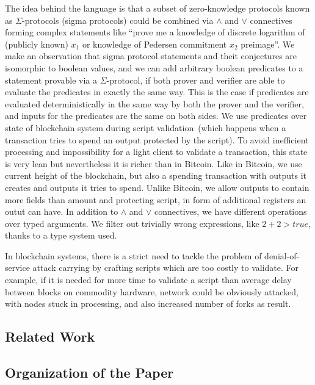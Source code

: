 \documentclass[11pt]{article}
\newcommand{\authnote}[2]{\marginpar{\parbox{\marginparwidth}{\tiny %
  \textsf{#1 {\textcolor{blue}{notes: #2}}}}}%
  \textcolor{blue}{\textbf{\dag}}}
\newcommand{\authnote}[2]{
  \textsf{#1 \textcolor{blue}{: #2}}}
\newcommand{\authnote}[2]{}
\newcommand{\knote}[1]{{\authnote{\textcolor{green}{kushti notes}}{#1}}}
\begin{document}
The idea behind the language is that a subset of zero-knowledge protocols known as $\Sigma$-protocols (sigma protocols) could be combined via $\land$ and $\lor$ connectives forming complex statements like ``prove me a knowledge of discrete logarithm of (publicly known) $x_1$ or knowledge of Pedersen commitment $x_2$ preimage''. We make an observation that sigma protocol statements and theit conjectures are isomorphic to boolean values, and we can add arbitrary boolean predicates to a statement provable via a $\Sigma$-protocol, if both prover and verifier are able to evaluate the predicates in exactly the same way. This is the case if predicates are evaluated deterministically in the same way by both the prover and the verifier, and inputs for the predicates are the same on both sides. We use predicates over state of blockchain system during script validation~(which happens when a transaction tries to spend an output protected by the script). To avoid inefficient processing and impossibility for a light client to validate a transaction, this state is very lean but nevertheless it is richer than in Bitcoin. Like in Bitcoin, we use current height of the blockchain, but also a spending transaction with outputs it creates and outputs it tries to spend. Unlike Bitcoin, we allow outputs to contain more fields than amount and protecting script, in form of additional registers an outut can have. In addition to $\land$ and $\lor$ connectives, we have different operations over typed arguments. We filter out trivially wrong expressions, like $2 + 2 > true$, thanks to a type system used. 

In blockchain systems, there is a strict need to tackle the problem of denial-of-service attack carrying by crafting scripts which are too costly to validate. For example, if it is needed for more time to validate a script than average delay between blocks on commodity hardware, network could be obviously attacked, with nodes stuck in processing, and also increased number of forks as result. 


\subsection{Related Work}

\knote{Simplicity}
\knote{Plutus}
\knote{Typecoin?}
\knote{Rholang?}
\knote{FSM-DSL?}

\subsection{Organization of the Paper}
\end{document}
